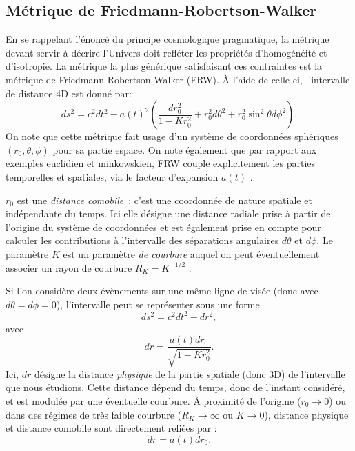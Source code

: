 \subsection{Métrique de Friedmann-Robertson-Walker}
En se rappelant l'énoncé du principe cosmologique pragmatique, la métrique devant servir à décrire l'Univers doit refléter les propriétés d'homogénéité et d'isotropie. La métrique la plus générique satisfaisant ces contraintes est la métrique de Friedmann-Robertson-Walker (FRW). À l'aide de celle-ci, l'intervalle de distance 4D est donné par:
\begin{equation}
ds^2=c^2dt^2-a(t)^2(\frac{dr_0^2}{1-Kr_0^2}+r_0^2d\theta^2+r_0^2\sin^2\theta d\phi^2).
\label{e:FRW}
\end{equation}
On note que cette métrique fait usage d'un système de coordonnées sphériques $(r_0,\theta,\phi)$ pour sa partie espace. On note également que par rapport aux exemples euclidien et minkowskien, FRW couple explicitement les parties temporelles et spatiales, via le facteur d'expansion  $a(t)$ .  

$r_0$ est une \textit{distance comobile}~: c'est une coordonnée de nature spatiale et indépendante du temps. Ici elle désigne une distance radiale prise à partir de l'origine du système de coordonnées et est également prise en compte pour calculer les contributions à l'intervalle des séparations angulaires $d\theta$ et $d\phi$. Le paramètre $K$ est un paramètre \textit{de courbure} auquel on peut éventuellement associer un rayon de courbure $R_K=K^{-1/2}$ .

Si l'on considère deux évènements sur une même ligne de visée (donc avec $d\theta=d\phi=0$), l'intervalle peut se représenter sous une forme
\begin{equation}
ds^2=c^2dt^2-dr^2,
\end{equation}
avec 
\begin{equation}
dr=\frac{a(t)dr_0}{\sqrt{1-Kr_0^2}}.
\label{e:phydist}
\end{equation}
Ici, $dr$ désigne la distance \textit{physique} de la partie spatiale (donc 3D) de l'intervalle que nous étudions. Cette distance dépend du temps, donc de l'instant considéré, et est modulée par une éventuelle courbure. À proximité de l'origine ($r_0\rightarrow 0$) ou dans des régimes de très faible courbure ($R_K\rightarrow\infty$ ou $K\rightarrow 0$), distance physique et distance comobile sont directement reliées par :
\begin{equation}
dr=a(t)dr_0.
\end{equation}

